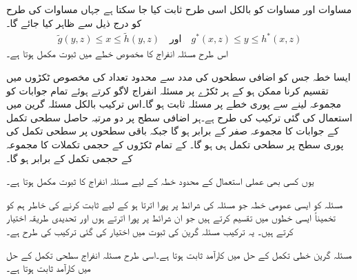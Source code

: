 مساوات  اور مساوات  کو بالکل اسی طرح ثابت کیا جا سکتا ہے جہاں مساوات  کی طرح  کو درج ذیل سے ظاہر کیا جائے گا۔
\begin{align*}
\tilde{g}(y,z) \le x\le \tilde{h}(y,z) \quad \text{اور}\quad g^*(x,z) \le y\le h^*(x,z)
\end{align*}
اس طرح مسئلہ انفراج کا مخصوص خطے میں ثبوت مکمل ہوتا ہے۔

ایسا خطہ  جس کو اضافی سطحوں کی مدد سے محدود تعداد کی مخصوص ٹکڑوں میں تقسیم کرنا ممکن ہو کے ہر ٹکڑے پر مسئلہ انفراج لاگو کرتے ہوئے تمام جوابات کو مجموعہ لینے سے  پوری خطے پر مسئلہ ثابت ہو گا۔اس ترکیب بالکل مسئلہ گرین میں استعمال کی گئی ترکیب کی طرح ہے۔ہر اضافی سطح پر دو مرتبہ حاصل سطحی تکمل کے جوابات  کا مجموعہ صفر کے برابر ہو گا جبکہ باقی سطحوں پر سطحی تکمل  کی پوری سطح  پر سطحی تکمل ہی ہو گا۔ کے تمام ٹکڑوں کے حجمی تکملات کا مجموعہ  کے حجمی تکمل کے برابر ہو گا۔

یوں کسی بھی عملی استعمال کے محدود خطہ  کے لیے مسئلہ انفراج کا ثبوت مکمل ہوتا ہے۔ 


مسئلہ کو ایسی عمومی خطہ  جو مسئلہ کی شرائط پر پورا اترتا ہو کے  لیے ثابت کرنے کی خاطر ہم   کو تخمیناً ایسی خطوں میں تقسیم کرتے ہیں جو ان شرائط پر پورا اترتے ہوں اور تحدیدی طریقہ اختیار کرتے ہیں۔ یہ ترکیب مسئلہ گرین کی ثبوت میں اختیار کی گئی ترکیب کی طرح ہے۔

مسئلہ گرین خطی تکمل کے حل میں کارآمد ثابت ہوتا ہے۔اسی طرح مسئلہ انفراج سطحی تکمل کے حل میں کارآمد ثابت ہوتا ہے۔

